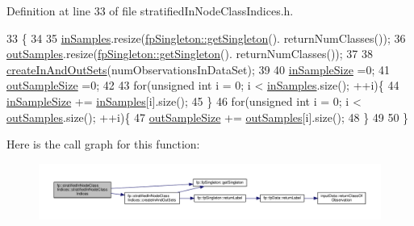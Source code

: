 Definition at line 33 of file stratified\+In\+Node\+Class\+Indices.\+h.


\begin{DoxyCode}
33                                                                              \{
34 
35                 \hyperlink{classfp_1_1stratifiedInNodeClassIndices_a6bfa636c77b48163f5d245959ea753d0}{inSamples}.resize(\hyperlink{classfp_1_1fpSingleton_a8bdae77b68521003e3fc630edec2e240}{fpSingleton::getSingleton}().
      returnNumClasses());
36                 \hyperlink{classfp_1_1stratifiedInNodeClassIndices_aa569f727e65e0b4b0815e71c1ee819e8}{outSamples}.resize(\hyperlink{classfp_1_1fpSingleton_a8bdae77b68521003e3fc630edec2e240}{fpSingleton::getSingleton}().
      returnNumClasses());
37 
38                 \hyperlink{classfp_1_1stratifiedInNodeClassIndices_a64bc290a78f3800cef41d42ebe64ff1b}{createInAndOutSets}(numObservationsInDataSet);
39 
40                 \hyperlink{classfp_1_1stratifiedInNodeClassIndices_a2acb617e3212806ae7f994d925bd1468}{inSampleSize} =0;
41                 \hyperlink{classfp_1_1stratifiedInNodeClassIndices_aa947b545e6751902344e832fcc1c9641}{outSampleSize} =0;
42 
43                 \textcolor{keywordflow}{for}(\textcolor{keywordtype}{unsigned} \textcolor{keywordtype}{int} i = 0; i < \hyperlink{classfp_1_1stratifiedInNodeClassIndices_a6bfa636c77b48163f5d245959ea753d0}{inSamples}.size(); ++i)\{
44                     \hyperlink{classfp_1_1stratifiedInNodeClassIndices_a2acb617e3212806ae7f994d925bd1468}{inSampleSize} += \hyperlink{classfp_1_1stratifiedInNodeClassIndices_a6bfa636c77b48163f5d245959ea753d0}{inSamples}[i].size();
45                 \}
46                 \textcolor{keywordflow}{for}(\textcolor{keywordtype}{unsigned} \textcolor{keywordtype}{int} i = 0; i < \hyperlink{classfp_1_1stratifiedInNodeClassIndices_aa569f727e65e0b4b0815e71c1ee819e8}{outSamples}.size(); ++i)\{
47                     \hyperlink{classfp_1_1stratifiedInNodeClassIndices_aa947b545e6751902344e832fcc1c9641}{outSampleSize} += \hyperlink{classfp_1_1stratifiedInNodeClassIndices_aa569f727e65e0b4b0815e71c1ee819e8}{outSamples}[i].size();
48                 \}
49 
50             \}
\end{DoxyCode}
Here is the call graph for this function\+:\nopagebreak
\begin{figure}[H]
\begin{center}
\leavevmode
\includegraphics[width=350pt]{classfp_1_1stratifiedInNodeClassIndices_acceb2fa1061c82ec37da7674784bc8b8_cgraph}
\end{center}
\end{figure}


